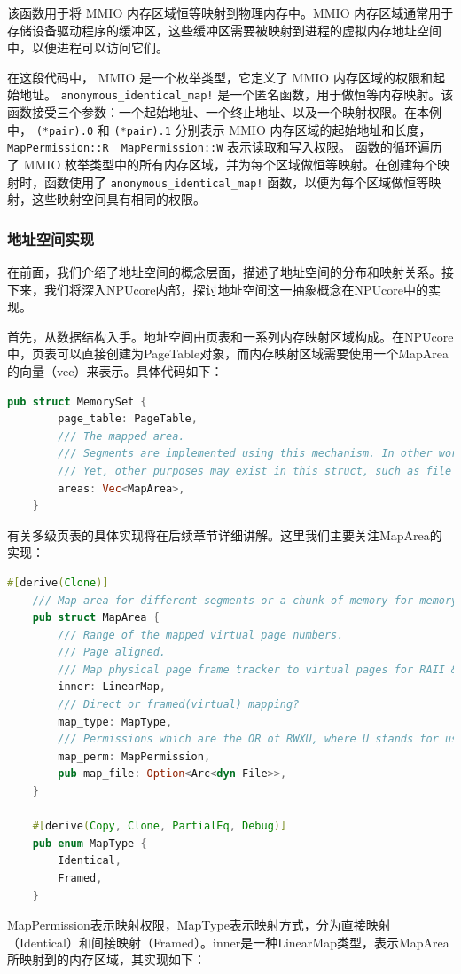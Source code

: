 该函数用于将 MMIO 内存区域恒等映射到物理内存中。MMIO
内存区域通常⽤于存储设备驱动程序的缓冲区，这些缓冲区需要被映射到进程的虚拟内存地址空间中，以便进程可以访问它们。

在这段代码中， MMIO 是一个枚举类型，它定义了 MMIO
内存区域的权限和起始地址。 \texttt{anonymous\_identical\_map!}
是一个匿名函数，用于做恒等内存映射。该函数接受三个参数：一个起始地址、一个终止地址、以及一个映射权限。在本例中，
\texttt{(*pair).0} 和 \texttt{(*pair).1} 分别表示 MMIO 内存区域的起始地址和长度，
\texttt{MapPermission::R\ \textbar{}\ MapPermission::W}
表示读取和写入权限。 函数的循环遍历了 MMIO
枚举类型中的所有内存区域，并为每个区域做恒等映射。在创建每个映射时，函数使用了 \texttt{anonymous\_identical\_map!} 函数，以便为每个区域做恒等映射，这些映射空间具有相同的权限。

\subsubsection{地址空间实现}

在前面，我们介绍了地址空间的概念层面，描述了地址空间的分布和映射关系。接下来，我们将深入NPUcore内部，探讨地址空间这一抽象概念在NPUcore中的实现。

首先，从数据结构入手。地址空间由页表和一系列内存映射区域构成。在NPUcore中，页表可以直接创建为PageTable对象，而内存映射区域需要使用一个MapArea的向量（vec）来表示。具体代码如下：

\begin{lstlisting}[language={Rust}, caption={MemorySet}]
	pub struct MemorySet {
		page_table: PageTable,
		/// The mapped area.
		/// Segments are implemented using this mechanism. In other words, they may be considered a subset of MapArea.
		/// Yet, other purposes may exist in this struct, such as file mapping.
		areas: Vec<MapArea>,
	}
\end{lstlisting}
有关多级页表的具体实现将在后续章节详细讲解。这里我们主要关注MapArea的实现：

\begin{lstlisting}[language={Rust},caption={MapArea}]
	#[derive(Clone)]
	/// Map area for different segments or a chunk of memory for memory mapped file access.
	pub struct MapArea {
		/// Range of the mapped virtual page numbers.
		/// Page aligned.
		/// Map physical page frame tracker to virtual pages for RAII & lookup.
		inner: LinearMap,
		/// Direct or framed(virtual) mapping?
		map_type: MapType,
		/// Permissions which are the OR of RWXU, where U stands for user.
		map_perm: MapPermission,
		pub map_file: Option<Arc<dyn File>>,
	}
	
	#[derive(Copy, Clone, PartialEq, Debug)]
	pub enum MapType {
		Identical,
		Framed,
	}
\end{lstlisting}
MapPermission表示映射权限，MapType表示映射方式，分为直接映射（Identical）和间接映射（Framed）。inner是一种LinearMap类型，表示MapArea所映射到的内存区域，其实现如下：

